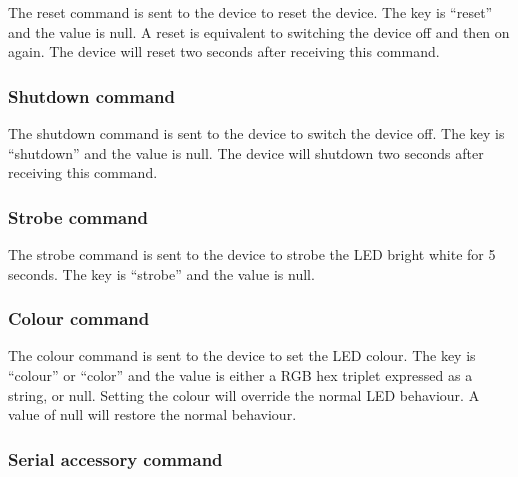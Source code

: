 The reset command is sent to the device to reset the device.  The key is \enquote{reset} and the value is null.  A reset is equivalent to switching the device off and then on again.  The device will reset two seconds after receiving this command.


\subsubsection{Shutdown command}

The shutdown command is sent to the device to switch the device off.  The key is \enquote{shutdown} and the value is null.  The device will shutdown two seconds after receiving this command.





\subsubsection{Strobe command}

The strobe command is sent to the device to strobe the \ac{LED} bright white for 5 seconds.  The key is \enquote{strobe} and the value is null.


\subsubsection{Colour command}

The colour command is sent to the device to set the \ac{LED} colour.  The key is \enquote{colour} or \enquote{color} and the value is either a \ac{RGB} hex triplet expressed as a string, or null.  Setting the colour will override the normal \ac{LED} behaviour.  A value of null will restore the normal behaviour.


\subsubsection{Serial accessory command}

